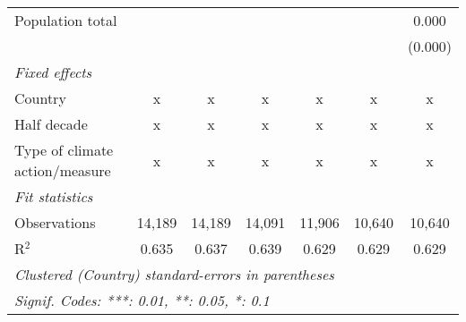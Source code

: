 \begin{tabular}{lcccccc}
   Population total                                          &               &               &               &              &              & 0.000\\   
                                                             &               &               &               &              &              & (0.000)\\   
   \emph{Fixed effects}\\
   Country                                                   & x             & x             & x             & x            & x            & x\\  
   Half decade                                               & x             & x             & x             & x            & x            & x\\  
   Type of climate action/measure                            & x             & x             & x             & x            & x            & x\\  
   \midrule \emph{Fit statistics}\\
   Observations                                              & 14,189        & 14,189        & 14,091        & 11,906       & 10,640       & 10,640\\  
   R$^2$                                                     & 0.635         & 0.637         & 0.639         & 0.629        & 0.629        & 0.629\\  
   \midrule
   \multicolumn{7}{l}{\emph{Clustered (Country) standard-errors in parentheses}}\\
   \multicolumn{7}{l}{\emph{Signif. Codes: ***: 0.01, **: 0.05, *: 0.1}}\\
\end{tabular}
\par\endgroup


